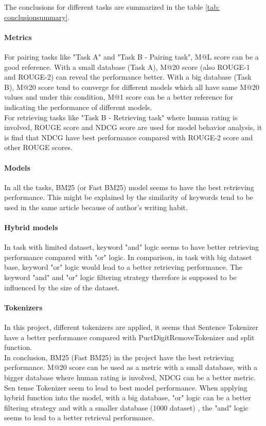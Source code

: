The conclusions for different tasks are summarized in the table \ref{tab: conclusionsummary}.

\paragraph{Metrics}
For pairing tasks like "Task A" and "Task B - Pairing task", M@L score can be a good reference. 
With a small database (Task A), M@20 score (also ROUGE-1 and ROUGE-2) can reveal the performance better. With a big database (Task B), M@20 score tend to converge for different models which all have same M@20 values and under this condition, M@1 score can be a better reference for indicating the performance of different models.\\

For retrieving tasks like "Task B - Retrieving task" where human rating is involved, ROUGE score and NDCG score are used for model behavior analysis, it is find that NDCG have best performance compared with ROUGE-2 score and other ROUGE scores.

\paragraph{Models}
In all the tasks, BM25 (or Fast BM25) model seems to have the best retrieving performance. 
This might be explained by the similarity of keywords tend to be used in the same article because of author's writing habit.

\paragraph{Hybrid models}
In task with limited dataset, keyword "and" logic seems to have better retrieving performance compared with "or" logic.
In comparison, in task with big dataset base, keyword "or" logic would lead to a better retrieving performance.
The keyword "and" and "or" logic filtering strategy therefore is supposed to be influenced by the size of the dataset.

\paragraph{Tokenizers}
In this project, different tokenizers are applied, it seems that Sentence Tokenizer have a better performance compared with PuctDigitRemoveTokenizer and split function.\\

In conclusion, BM25 (Fast BM25) in the project have the best retrieving performance. 
M@20 score can be used as a metric with a small database, with a bigger database where human rating is involved, NDCG can be a better metric.
Sen tense Tokenizer seem to lead to best model performance. When applying hybrid function into the model, with a big database, "or" logic can be a better filtering strategy and with a smaller database (1000 dataset) , the "and" logic seems to lead to a better retrieval performance.


